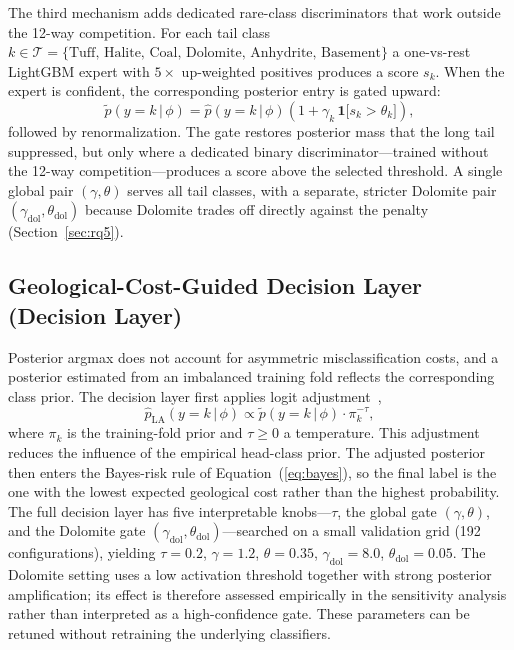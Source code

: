 \documentclass[bdcc,article,submit,pdftex,moreauthors]{Definitions/mdpi}
\begin{document}
The third mechanism adds dedicated rare-class discriminators that work outside the 12-way
competition. For each tail class $k\in\mathcal T=\{\text{Tuff, Halite,
Coal, Dolomite, Anhydrite, Basement}\}$ a one-vs-rest LightGBM expert with $5\times$
up-weighted positives produces a score $s_k$. When the expert is confident, the corresponding
posterior entry is gated upward:
\begin{equation}
\tilde p(y=k\,|\,\phi) = \hat p(y=k\,|\,\phi)\!\left(1+\gamma_k\,\mathbf 1\bigl[s_k>\theta_k\bigr]\right),
\label{eq:gate}
\end{equation}
followed by renormalization. The gate restores posterior mass that the long tail suppressed,
but only where a dedicated binary discriminator---trained without the 12-way
competition---produces a score above the selected threshold. A single global pair
$(\gamma,\theta)$ serves all tail
classes, with a separate, stricter Dolomite pair $(\gamma_\text{dol},\theta_\text{dol})$
because Dolomite trades off directly against the penalty (Section~\ref{sec:rq5}).

\subsection{Geological-Cost-Guided Decision Layer (Decision Layer)}
\label{sec:decision}
Posterior argmax does not account for asymmetric misclassification costs, and a posterior
estimated from an imbalanced training fold reflects the corresponding class prior. The
decision layer first applies logit
adjustment~\cite{menon2021logit},
\begin{equation}
\hat p_\text{LA}(y=k\,|\,\phi)\propto \tilde p(y=k\,|\,\phi)\cdot \pi_k^{-\tau},
\label{eq:logitadj}
\end{equation}
where $\pi_k$ is the training-fold prior and $\tau\geq 0$ a temperature. This adjustment
reduces the influence of the empirical head-class prior. The adjusted posterior then enters the
Bayes-risk rule of Equation~(\ref{eq:bayes}), so the final label is the one with the lowest
expected geological cost rather than the highest probability. The full decision layer has
five interpretable knobs---$\tau$, the global gate $(\gamma,\theta)$, and the Dolomite gate
$(\gamma_\text{dol},\theta_\text{dol})$---searched on a small validation grid (192
configurations), yielding $\tau=0.2$, $\gamma=1.2$, $\theta=0.35$,
$\gamma_\text{dol}=8.0$, $\theta_\text{dol}=0.05$. The Dolomite setting uses a low activation
threshold together with strong posterior amplification; its effect is therefore assessed
empirically in the sensitivity analysis rather than interpreted as a high-confidence gate.
These parameters can be retuned without retraining the underlying classifiers.
\end{document}
